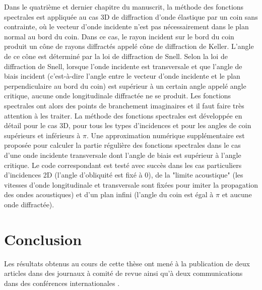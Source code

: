 Dans le quatrième et dernier chapitre du manuscrit, la méthode des fonctions spectrales est appliquée au cas 3D de diffraction d'onde élastique par un coin sans contrainte, où le vecteur d'onde incidente n'est pas nécessairement dans le plan normal au bord du coin. Dans ce cas, le rayon incident sur le bord du coin produit un cône de rayons diffractés appelé cône de diffraction de Keller. L'angle de ce cône est déterminé par la loi de diffraction de Snell. Selon la loi de diffraction de Snell, lorsque l'onde incidente est transversale et que l'angle de biais incident (c'est-à-dire l'angle entre le vecteur d'onde incidente et le plan perpendiculaire au bord du coin) est supérieur à un certain angle appelé angle critique, aucune onde longitudinale diffractée ne se produit. Les fonctions spectrales ont alors des points de branchement imaginaires et il faut faire très attention à les traiter. La méthode des fonctions spectrales est développée en détail pour le cas 3D, pour tous les types d'incidences et pour les angles de coin supérieurs et inférieurs à $\pi$. Une approximation numérique supplémentaire est proposée pour calculer la partie régulière des fonctions spectrales dans le cas d'une onde incidente transversale dont l'angle de biais est supérieur à l'angle critique. Le code correspondant est testé avec succès dans les cas particuliers d'incidences 2D (l'angle d'obliquité est fixé à $0$), de la "limite acoustique" (les vitesses d'onde longitudinale et transversale sont fixées pour imiter la propagation des ondes acoustiques) et d'un plan infini (l'angle du coin est égal à $\pi$ et aucune onde diffractée).

\section[Conclusion]{Conclusion}

Les résultats obtenus au cours de cette thèse ont mené à la publication de deux articles dans des journaux à comité de revue \cite{article, articleelasto} ainsi qu'à deux communications dans des conférences internationales \cite{DD2018,AFPAC}.